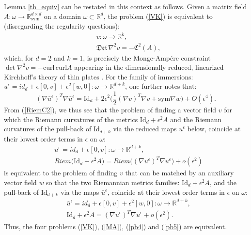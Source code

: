 \documentclass[reqno,twoside,11pt]{amsart}
\newcommand{\sym}{\mathrm{sym}}
\newcommand{\curl}{\mathrm{curl}}
\newcommand{\Id}{\mathrm{Id}}
\newcommand{\R}{\mathbb{R}}
\numberwithin{equation}{section}
\theoremstyle{plain}
\theoremstyle{definition}
\begin{document}
\medskip

\noindent Lemma \ref{th_equiv} can be restated in this context as
follows. Given a matrix field $A:\omega\to\R^{d\times
  d}_\sym$ on a domain $\omega\subset\R^d$, the problem (\ref{VK}) is
equivalent to (disregarding the regularity questions):
\begin{equation*}\tag{MA}\label{MA}
\begin{split}
& v:\omega\to \R^k, \\ & \mathfrak{Det}\,\nabla^2v = - \mathfrak{C}^2(A),
\end{split}
\end{equation*}
which, for $d=2$ and $k=1$, is precisely the Monge-Amp\'ere constraint
$\det\nabla^2v = - \curl\,\curl A$ appearing in the 
dimensionally reduced, linearized Kirchhoff's theory of thin plates \cite{FJM}.
For the family of immersions:
$\bar u^\epsilon = id_d + \epsilon [0,v] +\epsilon^2[w,0]:\omega\to\R^{d+k}$,
one further notes that:
$$(\nabla\bar u^\epsilon)^T\nabla \bar u^\epsilon = \Id_d +
2\epsilon^2\big(\frac{1}{2}(\nabla v)^T\nabla v + \sym\nabla w\big) + O(\epsilon^4).$$
From (\ref{RiemC2}), we thus see that the problem of finding a vector field $v$ for
which the Riemann curvatures of the metrics $\Id_d+\epsilon^2 A$ and the Riemann
curvatures of the pull-back of $\Id_{d+k}$ via the reduced maps
$u^\epsilon$ below, coincide at their lowest order terms in $\epsilon$ on $\omega$:
\begin{equation}\label{pb4}
\begin{split}
& u^\epsilon = id_d + \epsilon [0,v]:\omega\to\R^{d+k},
\\ & Riem\big(\Id_d+\epsilon^2A\big) = Riem\big((\nabla
u^\epsilon)^T\nabla u^\epsilon\big) + o(\epsilon^2)
\end{split}
\end{equation}
is equivalent to the problem of finding $v$ that can be matched by an
auxiliary vector field $w$ so that the two Riemannian metrics families: $\Id_d+\epsilon^2 A$,
and the pull-back of $\Id_{d+k}$ via the maps
$\bar u^\epsilon$, coincide at their lowest order terms in $\epsilon$ on $\omega$:
\begin{equation}\label{pb5}
\begin{split}
& \bar u^\epsilon = id_d + \epsilon [0,v] + \epsilon^2[w,0]:\omega\to\R^{d+k},
\\ & \Id_d+\epsilon^2A = (\nabla \bar u^\epsilon )^T\nabla \bar u^\epsilon  + o(\epsilon^2).
\end{split}
\end{equation}
Thus, the four problems (\ref{VK}), (\ref{MA}), (\ref{pb4}) and (\ref{pb5}) are equivalent.
\end{document}
